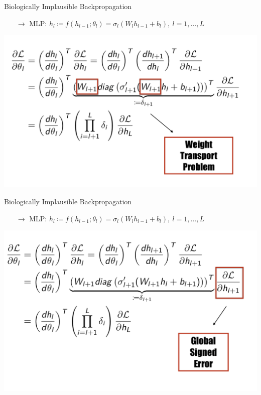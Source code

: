 \documentclass[dvipsnames, usenames]{beamer}
\begin{document}
\begin{frame}[noframenumbering]{Biologically Implausible Backpropagation}

\begin{itemize}
	\item[$\rightarrow$] MLP: $h_l \coloneqq f(h_{l-1}; \theta_l) = \sigma_l (W_l h_{l-1} + b_l), \ l=1,\dots, L$
\end{itemize}

\centering
\includegraphics[width=1.1\textwidth]{../figures/report/backprop_2}

\end{frame}


\begin{frame}[noframenumbering]{Biologically Implausible Backpropagation}

\begin{itemize}
	\item[$\rightarrow$] MLP: $h_l \coloneqq f(h_{l-1}; \theta_l) = \sigma_l (W_l h_{l-1} + b_l), \ l=1,\dots, L$
\end{itemize}

\centering
\includegraphics[width=1.1\textwidth]{../figures/report/backprop_3}

\end{frame}
\end{document}

